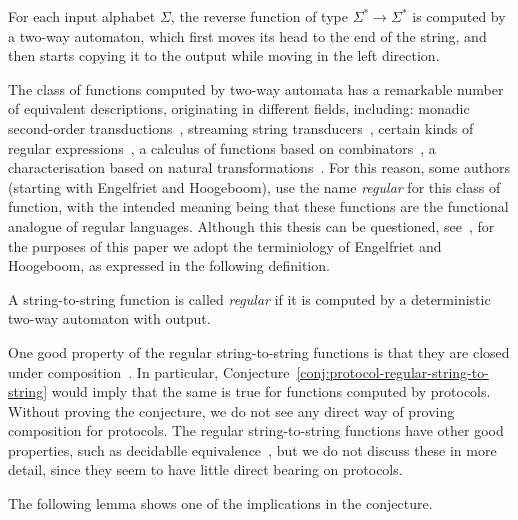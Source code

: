     \begin{myexample}[Reverse]
        For each input alphabet $\Sigma$, the reverse function of type $\Sigma^* \to \Sigma^*$ is computed by a  two-way automaton, which first moves its head to the end of the string, and then starts copying it to the output while moving in the left direction.
    \end{myexample}

    The class of functions computed by two-way automata has a remarkable number of equivalent descriptions,  originating in different fields, including:  monadic second-order transductions~\cite[Section 4]{engelfrietMSODefinableString2001}, streaming string transducers~\cite[Section 3]{alurExpressivenessStreamingString2010},  certain kinds of regular expressions~\cite[Section 2]{alur2014regular}, a calculus of functions based on  combinators~\cite[Theorem 6.1]{bojanczykRegularFirstOrderList2018}, a characterisation based on natural transformations~\cite[Theorem 3.2]{bojanczykTitoRegular23}. For this reason, some authors (starting with Engelfriet and Hoogeboom), use the name \emph{regular} for this class of function, with the intended meaning being that these functions are the functional analogue of regular languages. Although this thesis can be questioned, see~\cite{polyregular-survey}, for the purposes of this paper we adopt the terminiology of Engelfriet and Hoogeboom, as expressed in the following definition.


    \begin{definition}
        \label{def:regular-string-to-string}
        A string-to-string function is called \emph{regular} if it is computed by a deterministic two-way automaton with output.
    \end{definition}
    
    
    One good  property of the regular string-to-string functions is that they  are closed under composition~\cite[Theorem 2]{chytilSerialComposition2Way1977}. In particular, Conjecture~\ref{conj:protocol-regular-string-to-string} would imply that the same is true for functions computed by protocols. Without proving the conjecture, we do not see any direct way of proving composition for protocols. The  regular string-to-string functions have other good properties, such as decidablle equivalence~\cite[Theorem 1]{gurariEquivalenceProblemDeterministic1982}, but we do not discuss these in more detail, since they seem to have little direct bearing on protocols.


    The following lemma shows one of the implications in the conjecture.

